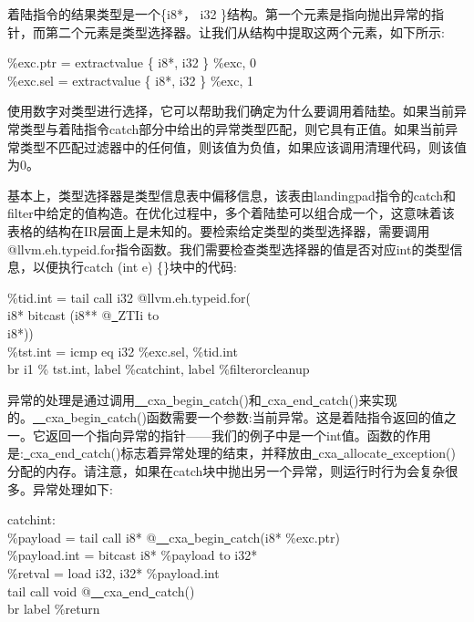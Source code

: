 着陆指令的结果类型是一个\{i8*， i32 \}结构。第一个元素是指向抛出异常的指针，而第二个元素是类型选择器。让我们从结构中提取这两个元素，如下所示:\par

\begin{tcolorbox}[colback=white,colframe=black]
\%exc.ptr = extractvalue \{ i8*, i32 \} \%exc, 0 \\
\%exc.sel = extractvalue \{ i8*, i32 \} \%exc, 1
\end{tcolorbox}

使用数字对类型进行选择，它可以帮助我们确定为什么要调用着陆垫。如果当前异常类型与着陆指令catch部分中给出的异常类型匹配，则它具有正值。如果当前异常类型不匹配过滤器中的任何值，则该值为负值，如果应该调用清理代码，则该值为0。\par

基本上，类型选择器是类型信息表中偏移信息，该表由landingpad指令的catch和filter中给定的值构造。在优化过程中，多个着陆垫可以组合成一个，这意味着该表格的结构在IR层面上是未知的。要检索给定类型的类型选择器，需要调用@llvm.eh.typeid.for指令函数。我们需要检查类型选择器的值是否对应int的类型信息，以便执行catch (int e) \{\}块中的代码:\par

\begin{tcolorbox}[colback=white,colframe=black]
\%tid.int = tail call i32 @llvm.eh.typeid.for( \\
\hspace*{6cm}i8* bitcast (i8** @\underline{~}ZTIi to  \\
\hspace*{6cm}i8*)) \\
\%tst.int = icmp eq i32 \%exc.sel, \%tid.int \\
br i1 \% tst.int, label \%catchint, label \%filterorcleanup
\end{tcolorbox}

异常的处理是通过调用\underline{~~}cxa\underline{~}begin\underline{~}catch()和\underline{~}cxa\underline{~}end\underline{~}catch()来实现的。\underline{~~}cxa\underline{~}begin\underline{~}catch()函数需要一个参数:当前异常。这是着陆指令返回的值之一。它返回一个指向异常的指针——我们的例子中是一个int值。函数的作用是:\underline{~}cxa\underline{~}end\underline{~}catch()标志着异常处理的结束，并释放由\underline{~}cxa\underline{~}allocate\underline{~}ex\allowbreak ception()分配的内存。请注意，如果在catch块中抛出另一个异常，则运行时行为会复杂很多。异常处理如下:\par

\begin{tcolorbox}[colback=white,colframe=black]
catchint: \\
\%payload = tail call i8* @\underline{~~}cxa\underline{~}begin\underline{~}catch(i8* \%exc.ptr) \\
\%payload.int = bitcast i8* \%payload to i32* \\
\%retval = load i32, i32* \%payload.int \\
tail call void @\underline{~~}cxa\underline{~}end\underline{~}catch() \\
br label \%return
\end{tcolorbox}

